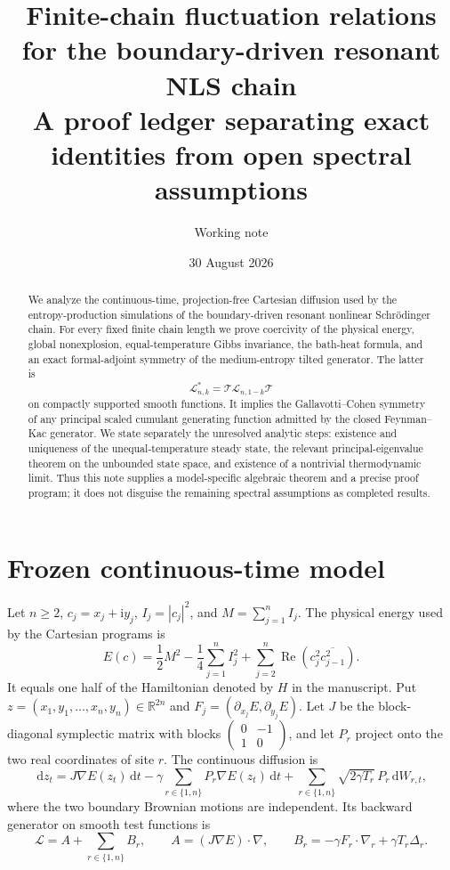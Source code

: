 \documentclass[11pt]{article}
\title{Finite-chain fluctuation relations for the boundary-driven resonant NLS chain\\
\large A proof ledger separating exact identities from open spectral assumptions}
\author{Working note}
\date{30 August 2026}
\theoremstyle{remark}
\newcommand{\R}{\mathbb R}
\newcommand{\dd}{\,\mathrm d}
\newcommand{\grad}{\nabla}
\newcommand{\cL}{\mathcal L}
\newcommand{\Thetaop}{\mathcal T}
\begin{document}
\maketitle

\begin{abstract}
We analyze the continuous-time, projection-free Cartesian diffusion used by
the entropy-production simulations of the boundary-driven resonant nonlinear
Schr\"odinger chain.  For every fixed finite chain length we prove coercivity
of the physical energy, global nonexplosion, equal-temperature Gibbs
invariance, the bath-heat formula, and an exact formal-adjoint symmetry of the
medium-entropy tilted generator.  The latter is
\[
  \cL_{n,k}^{*}=\Thetaop\cL_{n,1-k}\Thetaop
\]
on compactly supported smooth functions.  It implies the
Gallavotti--Cohen symmetry of any principal scaled cumulant generating
function admitted by the closed Feynman--Kac generator.  We state separately
the unresolved analytic steps: existence and uniqueness of the
unequal-temperature steady state, the relevant principal-eigenvalue theorem
on the unbounded state space, and existence of a nontrivial thermodynamic
limit.  Thus this note supplies a model-specific algebraic theorem and a
precise proof program; it does not disguise the remaining spectral assumptions
as completed results.
\end{abstract}

\section{Frozen continuous-time model}

Let $n\ge2$, $c_j=x_j+\mathrm i y_j$, $I_j=|c_j|^2$, and
$M=\sum_{j=1}^n I_j$.  The physical energy used by the Cartesian programs is
\begin{equation}\label{eq:energy}
 E(c)=\frac12M^2-\frac14\sum_{j=1}^n I_j^2
 +\sum_{j=2}^n\operatorname{Re}\!\left(c_j^2\overline{c_{j-1}^2}\right).
\end{equation}
It equals one half of the Hamiltonian denoted by $H$ in the manuscript.  Put
$z=(x_1,y_1,\ldots,x_n,y_n)\in\R^{2n}$ and
$F_j=(\partial_{x_j}E,\partial_{y_j}E)$.  Let $J$ be the block-diagonal
symplectic matrix with blocks
$\left(\begin{smallmatrix}0&-1\\1&0\end{smallmatrix}\right)$, and let $P_r$
project onto the two real coordinates of site $r$.  The continuous diffusion is
\begin{equation}\label{eq:sde}
 \dd z_t=J\grad E(z_t)\dd t
 -\gamma\sum_{r\in\{1,n\}}P_r\grad E(z_t)\dd t
 +\sum_{r\in\{1,n\}}\sqrt{2\gamma T_r}\,P_r\dd W_{r,t},
\end{equation}
where the two boundary Brownian motions are independent.  Its backward
generator on smooth test functions is
\begin{equation}\label{eq:generator}
 \cL=A+\sum_{r\in\{1,n\}}B_r,
 \qquad
 A=(J\grad E)\cdot\grad,
 \qquad
 B_r=-\gamma F_r\cdot\grad_r+\gamma T_r\Delta_r.
\end{equation}
\end{document}
